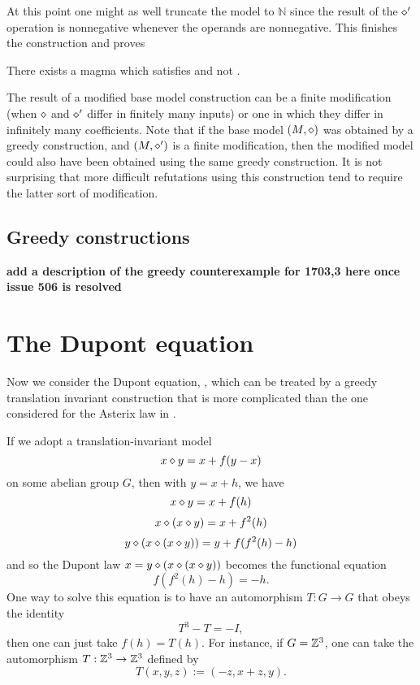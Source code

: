 At this point one might as well truncate the model to $\mathbb{N}$ since the result of the $\diamond'$
operation is nonnegative whenever the operands are nonnegative. This finishes the construction and proves

\begin{theorem}\label{non_imp_1659_4315_thm}
  \leanok
  There exists a magma which satisfies  and not .
\end{theorem}

The result of a modified base model construction can be a finite modification (when $\diamond$ and $\diamond'$
differ in finitely many inputs) or one in which they differ in infinitely many coefficients. Note that if the base
model $(M,\diamond)$ was obtained by a greedy construction, and $(M,\diamond')$ is a finite modification, then the
modified model could also have been obtained using the same greedy construction. It is not surprising that
more difficult refutations using this construction tend to require the latter sort of modification.


\subsection{Greedy constructions}

{\bf add a description of the greedy counterexample for 1703,3 here once issue 506 is resolved}


\section{The Dupont equation}\label{dupont-section}

Now we consider the Dupont equation, , which can be treated by a greedy translation invariant construction that is more complicated than the one considered for the Asterix law in .

If we adopt a translation-invariant model
$$ x \diamond y = x + f(y-x)$$
on some abelian group $G$, then with $y = x+h$, we have
$$ x \diamond y = x + f(h)$$
$$ x \diamond (x \diamond y) = x + f^2(h)$$
$$ y \diamond (x \diamond (x \diamond y)) = y + f(f^2(h)-h)$$
and so the Dupont law $x = y \diamond (x \diamond (x \diamond y))$ becomes the functional equation
\begin{equation}\label{dupont-eq}
  f(f^2(h)-h) = -h.
\end{equation}
One way to solve this equation is to have an automorphism $T: G \to G$ that obeys the identity
$$ T^3 - T = -I,$$
then one can just take $f(h) = T(h)$.  For instance, if $G = \mathbb{Z}^3$, one can take the automorphism $T: \mathbb{Z}^3 \to \mathbb{Z}^3$ defined by
$$ T(x,y,z) := (-z,x+z,y).$$

